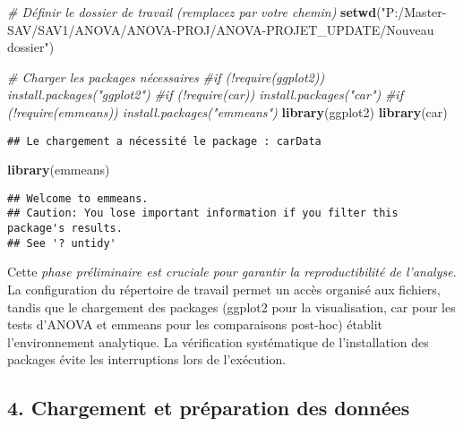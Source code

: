 \documentclass[
]{article}
\newenvironment{Shaded}{\begin{snugshade}}{\end{snugshade}}
\newcommand{\CommentTok}[1]{\textcolor[rgb]{0.56,0.35,0.01}{\textit{#1}}}
\newcommand{\FunctionTok}[1]{\textcolor[rgb]{0.13,0.29,0.53}{\textbf{#1}}}
\newcommand{\NormalTok}[1]{#1}
\newcommand{\StringTok}[1]{\textcolor[rgb]{0.31,0.60,0.02}{#1}}
\begin{document}
\begin{Shaded}
\begin{Highlighting}[]
\CommentTok{\# Définir le dossier de travail (remplacez par votre chemin)}
\FunctionTok{setwd}\NormalTok{(}\StringTok{"P:/Master{-}SAV/SAV1/ANOVA/ANOVA{-}PROJ/ANOVA{-}PROJET\_UPDATE/Nouveau dossier"}\NormalTok{)}

\CommentTok{\# Charger les packages nécessaires}
\CommentTok{\#if (!require(ggplot2)) install.packages("ggplot2")}
\CommentTok{\#if (!require(car)) install.packages("car")}
\CommentTok{\#if (!require(emmeans)) install.packages("emmeans")}
\FunctionTok{library}\NormalTok{(ggplot2)}
\FunctionTok{library}\NormalTok{(car)}
\end{Highlighting}
\end{Shaded}

\begin{verbatim}
## Le chargement a nécessité le package : carData
\end{verbatim}

\begin{Shaded}
\begin{Highlighting}[]
\FunctionTok{library}\NormalTok{(emmeans)}
\end{Highlighting}
\end{Shaded}

\begin{verbatim}
## Welcome to emmeans.
## Caution: You lose important information if you filter this package's results.
## See '? untidy'
\end{verbatim}

Cette \emph{phase préliminaire est cruciale pour garantir la
reproductibilité de l'analyse}. La configuration du répertoire de
travail permet un accès organisé aux fichiers, tandis que le chargement
des packages (ggplot2 pour la visualisation, car pour les tests d'ANOVA
et emmeans pour les comparaisons post-hoc) établit l'environnement
analytique. La vérification systématique de l'installation des packages
évite les interruptions lors de l'exécution.

\subsection{4. Chargement et préparation des
données}\label{chargement-et-pruxe9paration-des-donnuxe9es}
\end{document}
